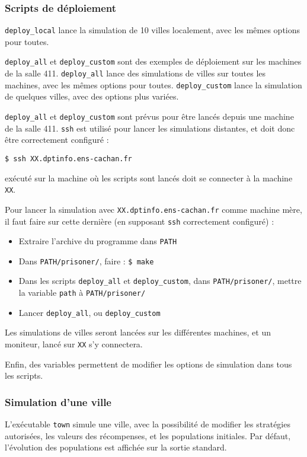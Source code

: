 \documentclass[10pt]{article}
\begin{document}
\subsubsection{Scripts de déploiement}
\verb|deploy_local| lance la simulation de 10 villes localement, avec les mêmes options pour toutes.

\verb|deploy_all| et \verb|deploy_custom| sont des exemples de déploiement sur les machines de la salle 411.
\verb|deploy_all| lance des simulations de villes sur toutes les machines, avec les mêmes options pour toutes.
\verb|deploy_custom| lance la simulation de quelques villes, avec des options plus variées.

\verb|deploy_all| et \verb|deploy_custom| sont prévus pour être lancés depuis une machine de la salle 411.
\verb|ssh| est utilisé pour lancer les simulations distantes, et doit donc être correctement configuré :
\begin{verbatim}
$ ssh XX.dptinfo.ens-cachan.fr
\end{verbatim}
exécuté sur la machine où les scripts sont lancés doit se connecter à la machine \verb|XX|.

Pour lancer la simulation avec \verb|XX.dptinfo.ens-cachan.fr| comme machine mère, il faut faire
sur cette dernière (en supposant \verb|ssh| correctement configuré) :
\begin{itemize}
\item Extraire l'archive du programme dans \verb|PATH|
\item Dans \verb|PATH/prisoner/|, faire : \verb|$ make|
\item Dans les scripts \verb|deploy_all| et \verb|deploy_custom|, dans \verb|PATH/prisoner/|,
      mettre la variable \verb|path| à \verb|PATH/prisoner/|
\item Lancer \verb|deploy_all|, ou \verb|deploy_custom|
\end{itemize}

Les simulations de villes seront lancées sur les différentes machines, et un moniteur, lancé sur \verb|XX| s'y connectera.

Enfin, des variables permettent de modifier les options de simulation dans tous les scripts.


\subsubsection{Simulation d'une ville}
L'exécutable \verb|town| simule une ville, avec la possibilité de modifier les stratégies autorisées,
les valeurs des récompenses, et les populations initiales. Par défaut, l'évolution des populations
est affichée sur la sortie standard.
\end{document}
